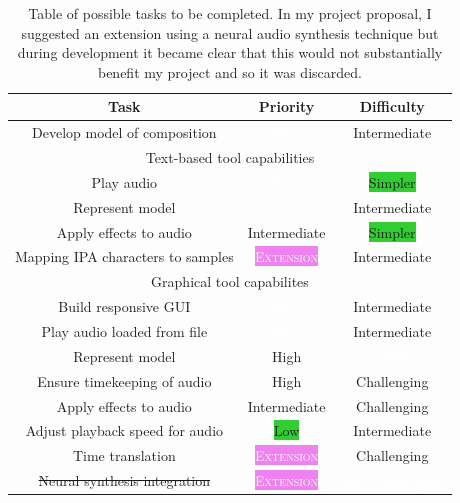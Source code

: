 \documentclass[12pt,a4paper,oneside,openright]{report}
\newcommand{\vital}{\colorbox{Bittersweet}{\textcolor{White}{Vital}}}
\newcommand{\veryhard}{\colorbox{BrickRed}{\textcolor{White}{Very Challenging}}}
\newcommand{\hard}{\colorbox{RedOrange}{Challenging}}
\newcommand{\high}{\colorbox{RedOrange}{High}}
\newcommand{\medium}{\colorbox{Dandelion}{Intermediate}}
\newcommand{\interm}{\colorbox{Dandelion}{Intermediate}}
\newcommand{\low}{\colorbox{LimeGreen}{Low}}
\newcommand{\easy}{\colorbox{LimeGreen}{Simpler}}
\newcommand{\extension}{\colorbox{Violet}{\textcolor{White}{\textsc{Extension}}}}
\begin{document}
\begin{table}[h]
    \centering
    \begin{tabular}{|c|c|c|}
        \hline
         Task & Priority & Difficulty \\
         \hline
         Develop model of composition & \vital & \medium \\
         \hline
         \multicolumn{3}{|c|}{Text-based tool capabilities} \\
         \hline
         Play audio & \vital & \easy \\
         Represent model & \vital & \medium \\
         Apply effects to audio & \interm & \easy \\
         Mapping IPA characters to samples & \extension & \medium \\
         \hline
         \multicolumn{3}{|c|}{Graphical tool capabilites} \\
         \hline
         Build responsive GUI & \vital & \medium \\
         Play audio loaded from file & \vital & \medium \\
         Represent model & \high & \veryhard \\
         Ensure timekeeping of audio & \high & \hard \\
         Apply effects to audio & \interm & \hard \\
         Adjust playback speed for audio & \low & \medium \\
         Time translation & \extension & \hard \\
         \st{Neural synthesis integration} & \extension & \veryhard \\
         \hline
    \end{tabular}
    \caption{Table of possible tasks to be completed. In my project proposal, I suggested an extension using a neural audio synthesis technique but during development it became clear that this would not substantially benefit my project and so it was discarded.}
    \label{tab:req_anal}
\end{table}
\end{document}
